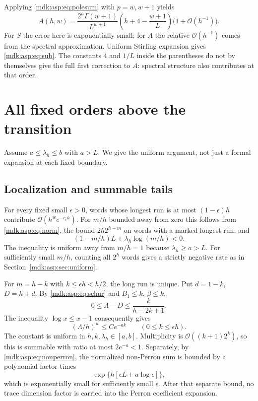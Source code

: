 \documentclass[11pt,letterpaper]{article}
\numberwithin{equation}{section}
\theoremstyle{remark}\newtheorem{remark}[theorem]{Remark}
\newcommand{\Oh}{\mathcal O}\newcommand{\Q}{\mathbb Q}\newcommand{\N}{\mathbb N}\newcommand{\R}{\mathbb R}
\begin{document}
Applying \eqref{mdk:asp:eq:polesum} with $p=w,w+1$ yields
\begin{equation}\label{mdk:asp:eq:subgamma}
A(h,w)=\frac{2^h\Gamma(w+1)}{L^{w+1}}
\left(h+4-\frac{w+1}{L}\right)\bigl(1+\Oh(h^{-1})\bigr).
\end{equation}
For $S$ the error here is exponentially small; for $A$ the relative $\Oh(h^{-1})$ comes from the spectral approximation. Uniform Stirling expansion gives \eqref{mdk:asp:eq:sub}. The constants $4$ and $1/L$ inside the parentheses do not by themselves give the full first correction to $A$: spectral structure also contributes at that order.

\section{All fixed orders above the transition}\label{mdk:asp:sec:super}
Assume $a\le\lambda_h\le b$ with $a>L$. We give the uniform argument, not just a formal expansion at each fixed boundary.

\subsection{Localization and summable tails}
For every fixed small $\epsilon>0$, words whose longest run is at most $(1-\epsilon)h$ contribute $\Oh(h^w e^{-c_\epsilon h})$. For $m/h$ bounded away from zero this follows from \eqref{mdk:asp:eq:norm}, the bound $2h2^{h-m}$ on words with a marked longest run, and
\[
(1-m/h)L+\lambda_h\log(m/h)<0.
\]
The inequality is uniform away from $m/h=1$ because $\lambda_h\ge a>L$. For sufficiently small $m/h$, counting all $2^h$ words gives a strictly negative rate as in Section~\ref{mdk:asp:sec:uniform}.

For $m=h-k$ with $k\le\epsilon h<h/2$, the long run is unique. Put $d=1-k$, $D=h+d$. By \eqref{mdk:asp:eq:schur} and $B_1\le k$, $\beta\le k$,
\begin{equation}\label{mdk:asp:eq:tailperturb}
0\le\Lambda-D\le\frac{k}{h-2k+1}.
\end{equation}
The inequality $\log x\le x-1$ consequently gives
\begin{equation}\label{mdk:asp:eq:tail}
(\Lambda/h)^w\le C e^{-ak}\qquad(0\le k\le\epsilon h).
\end{equation}
The constant is uniform in $h,k,\lambda_h\in[a,b]$. Multiplicity is $\Oh((k+1)2^k)$, so this is summable with ratio at most $2e^{-a}<1$. Separately, by \eqref{mdk:asp:eq:nonperron}, the normalized non-Perron sum is bounded by a polynomial factor times
\[
\exp\{h[\epsilon L+a\log\epsilon]\},
\]
which is exponentially small for sufficiently small $\epsilon$. After that separate bound, no trace dimension factor is carried into the Perron coefficient expansion.
\end{document}
